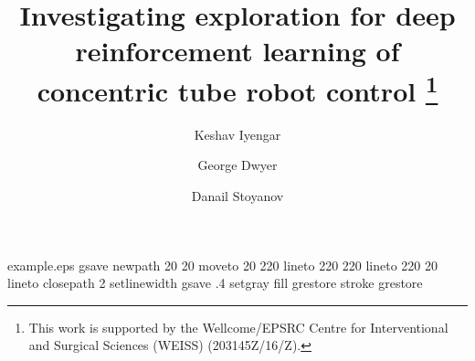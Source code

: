 %
%
%
%
%
\begin{filecontents*}{example.eps}
gsave
newpath
  20 20 moveto
  20 220 lineto
  220 220 lineto
  220 20 lineto
closepath
2 setlinewidth
gsave
  .4 setgray fill
grestore
stroke
grestore
\end{filecontents*}
%
\RequirePackage{fix-cm}
%
\documentclass{svjour3}                     %
%
\smartqed  %
%
\usepackage{graphicx}
%
%
\usepackage{amsmath}

%
%
%


\title{Investigating exploration for deep reinforcement learning of concentric tube robot control
\thanks{This work is supported by the Wellcome/EPSRC Centre for Interventional and Surgical Sciences (WEISS) (203145Z/16/Z).}
}


\author{Keshav Iyengar \and
        George Dwyer \and Danail Stoyanov
}



